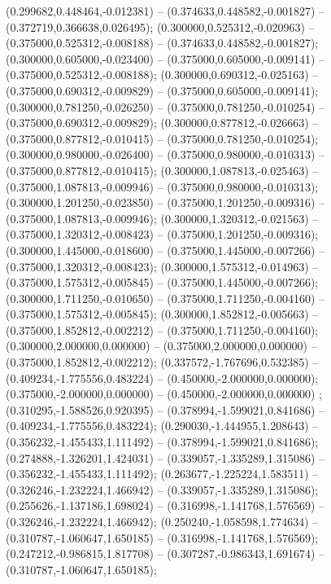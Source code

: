  (0.299682,0.448464,-0.012381) -- (0.374633,0.448582,-0.001827) -- (0.372719,0.366638,0.026495);
 (0.300000,0.525312,-0.020963) -- (0.375000,0.525312,-0.008188) -- (0.374633,0.448582,-0.001827);
 (0.300000,0.605000,-0.023400) -- (0.375000,0.605000,-0.009141) -- (0.375000,0.525312,-0.008188);
 (0.300000,0.690312,-0.025163) -- (0.375000,0.690312,-0.009829) -- (0.375000,0.605000,-0.009141);
 (0.300000,0.781250,-0.026250) -- (0.375000,0.781250,-0.010254) -- (0.375000,0.690312,-0.009829);
 (0.300000,0.877812,-0.026663) -- (0.375000,0.877812,-0.010415) -- (0.375000,0.781250,-0.010254);
 (0.300000,0.980000,-0.026400) -- (0.375000,0.980000,-0.010313) -- (0.375000,0.877812,-0.010415);
 (0.300000,1.087813,-0.025463) -- (0.375000,1.087813,-0.009946) -- (0.375000,0.980000,-0.010313);
 (0.300000,1.201250,-0.023850) -- (0.375000,1.201250,-0.009316) -- (0.375000,1.087813,-0.009946);
 (0.300000,1.320312,-0.021563) -- (0.375000,1.320312,-0.008423) -- (0.375000,1.201250,-0.009316);
 (0.300000,1.445000,-0.018600) -- (0.375000,1.445000,-0.007266) -- (0.375000,1.320312,-0.008423);
 (0.300000,1.575312,-0.014963) -- (0.375000,1.575312,-0.005845) -- (0.375000,1.445000,-0.007266);
 (0.300000,1.711250,-0.010650) -- (0.375000,1.711250,-0.004160) -- (0.375000,1.575312,-0.005845);
 (0.300000,1.852812,-0.005663) -- (0.375000,1.852812,-0.002212) -- (0.375000,1.711250,-0.004160);
 (0.300000,2.000000,0.000000) -- (0.375000,2.000000,0.000000) -- (0.375000,1.852812,-0.002212);
 (0.337572,-1.767696,0.532385) -- (0.409234,-1.775556,0.483224) -- (0.450000,-2.000000,0.000000);
 (0.375000,-2.000000,0.000000) -- (0.450000,-2.000000,0.000000) ;
 (0.310295,-1.588526,0.920395) -- (0.378994,-1.599021,0.841686) -- (0.409234,-1.775556,0.483224);
 (0.290030,-1.444955,1.208643) -- (0.356232,-1.455433,1.111492) -- (0.378994,-1.599021,0.841686);
 (0.274888,-1.326201,1.424031) -- (0.339057,-1.335289,1.315086) -- (0.356232,-1.455433,1.111492);
 (0.263677,-1.225224,1.583511) -- (0.326246,-1.232224,1.466942) -- (0.339057,-1.335289,1.315086);
 (0.255626,-1.137186,1.698024) -- (0.316998,-1.141768,1.576569) -- (0.326246,-1.232224,1.466942);
 (0.250240,-1.058598,1.774634) -- (0.310787,-1.060647,1.650185) -- (0.316998,-1.141768,1.576569);
 (0.247212,-0.986815,1.817708) -- (0.307287,-0.986343,1.691674) -- (0.310787,-1.060647,1.650185);
